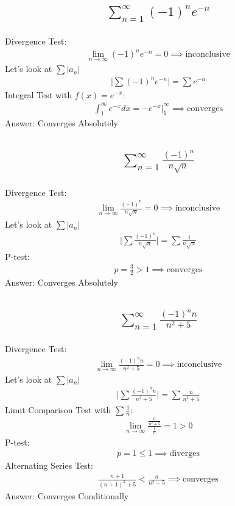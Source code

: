\documentclass{article}
\begin{document}
\subsection{
	\begin{align*}
		\sum_{n = 1}^\infty (-1)^n e^{-n}
	\end{align*}
}
Divergence Test:
\begin{align*}
	\lim_{n \to \infty} {(-1)^n e^{-n}} = 0 \implies \text{inconclusive}
\end{align*}
Let's look at $\sum |a_n|$
\begin{align*}
	\bigg| \sum (-1)^n e^{-n} \bigg| = \sum e^{-n}
\end{align*}
Integral Test with $f(x) = e^{-x}$:
\begin{align*}
	\int_1^\infty {e^{-x}dx} = -e^{-x} \bigg|_1^\infty \implies \text{converges}
\end{align*}
Answer: Converges Absolutely

\subsection{
	\begin{align*}
		\sum_{n = 1}^\infty \frac{(-1)^n}{n \sqrt{n}}
	\end{align*}
}
Divergence Test:
\begin{align*}
	\lim_{n \to \infty} {\frac{(-1)^n}{n \sqrt{n}}} = 0 \implies \text{inconclusive}
\end{align*}
Let's look at $\sum |a_n|$
\begin{align*}
	\bigg| \sum \frac{(-1)^n}{n \sqrt{n}} \bigg| = \sum \frac{1}{n \sqrt{n}}
\end{align*}
P-test:
\begin{align*}
	p = \frac{3}{2} > 1 \implies \text{converges}
\end{align*}
Answer: Converges Absolutely

\subsection{
	\begin{align*}
		\sum_{n = 1}^\infty \frac{(-1)^n n}{n^2 + 5}
	\end{align*}
}
Divergence Test:
\begin{align*}
	\lim_{n \to \infty} {\frac{(-1)^n n}{n^2 + 5}} = 0 \implies \text{inconclusive}
\end{align*}
Let's look at $\sum |a_n|$
\begin{align*}
	\bigg| \sum \frac{(-1)^n n}{n^2 + 5} \bigg| = \sum \frac{n}{n^2 + 5}
\end{align*}
Limit Comparison Test with $\sum \frac{1}{n}$:
\begin{align*}
	\lim_{n \to \infty} {\frac{\frac{n}{n^2 + 5}}{\frac{1}{n}}} = 1 > 0
\end{align*}
P-test:
\begin{align*}
	p = 1 \leq 1 \implies \text{diverges}
\end{align*}
Alternating Series Test:
\begin{align*}
	\frac{n+1}{(n + 1)^2 + 5} < \frac{n}{n^2 + 5} \implies \text{converges}
\end{align*}
Answer: Converges Conditionally
\end{document}
